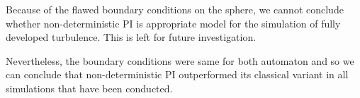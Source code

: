 Because of the flawed boundary conditions on the sphere, we cannot conclude whether non-deterministic PI is appropriate model for the simulation of fully developed turbulence. This is left for future investigation.

Nevertheless, the boundary conditions were same for both automaton and so we can conclude that non-deterministic PI outperformed its classical variant in all simulations that have been conducted. 

%
%
